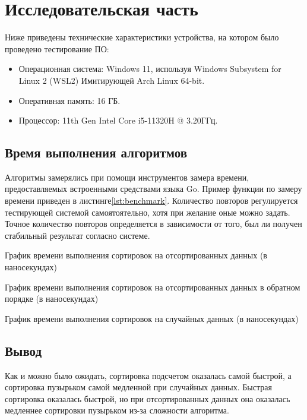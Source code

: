 \chapter{Исследовательская часть}
Ниже приведены технические характеристики устройства, на котором было проведено тестирование ПО:

\begin{itemize}
    \item Операционная система: Windows 11, используя Windows Subsystem for Linux 2 (WSL2)\cite{wsl2} Имитирующей Arch Linux\cite{arch} 64-bit.
    \item Оперативная память: 16 ГБ.
    \item Процессор: 11th Gen Intel\textsuperscript{\tiny\textregistered} Core\textsuperscript{\tiny\texttrademark} i5-11320H @ 3.20ГГц\cite{i5}.
\end{itemize}

\section{Время выполнения алгоритмов}
Алгоритмы замерялись при помощи инструментов замера времени, предоставляемых встроенными средствами языка Go\cite{go}.
Пример функции по замеру времени приведен в листинге\ref{lst:benchmark}.
Количество повторов регулируется тестирующей системой самоятоятельно, хотя при желание оные можно задать.
Точное количество повторов определяется в зависимости от того, был ли получен стабильный результат согласно системе.



График времени выполнения сортировок на отсортированных данных (в наносекундах)\newline
%

График времени выполнения сортировок на отсортированных данных в обратном порядке (в наносекундах)\newline
%

График времени выполнения сортировок на случайных данных (в наносекундах)\newline


\section*{Вывод}

Как и можно было ожидать, сортировка подсчетом оказалась самой быстрой, а сортировка пузырьком самой медленной при случайных данных.
Быстрая сортировка оказалась быстрой, но при отсортированных данных она оказалась медленнее сортировки пузырьком из-за сложности алгоритма.
